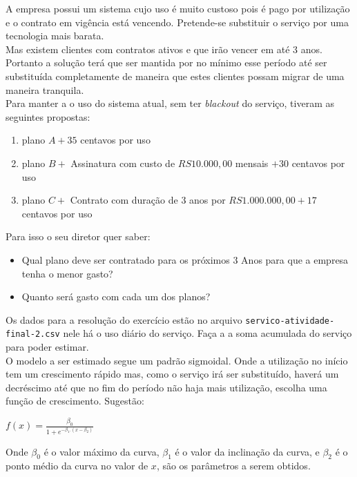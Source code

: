 \documentclass[a4paper,12pt]{article}
\begin{document}
A empresa possui um sistema cujo uso é muito custoso pois é pago por utilização e o contrato em vigência está vencendo.
Pretende-se substituir o serviço por uma tecnologia mais barata.\\

Mas existem clientes com contratos ativos e que irão vencer em até 3 anos. Portanto a solução terá que ser mantida por
no mínimo esse período até ser substituída completamente de maneira que estes clientes possam migrar de uma maneira
tranquila.\\

Para manter a o uso do sistema atual, sem ter \textit{blackout} do serviço, tiveram as seguintes propostas:

\begin{enumerate}
    \item plano $A + 35$ centavos por uso
    \item plano $B +$ Assinatura com custo de $RS 10.000,00$ mensais $+ 30$ centavos por uso
    \item plano $C +$ Contrato com duração de 3 anos por $RS 1.000.000,00 + 17$ centavos por uso\\
\end{enumerate}

Para isso o seu diretor quer saber:

\begin{itemize}
    \item Qual plano deve ser contratado para os próximos 3 Anos para que a empresa tenha o menor gasto?
    \item Quanto será gasto com cada um dos planos?
\end{itemize}
 
Os dados para a resolução do exercício estão no arquivo \texttt{servico-atividade-final-2.csv} nele há o uso diário do
serviço. Faça a a soma acumulada do serviço para poder estimar.\\
 
O modelo a ser estimado segue um padrão sigmoidal. Onde a utilização no início tem um crescimento rápido mas, como o
serviço irá ser substituído, haverá um decréscimo até que no fim do período não haja mais utilização, escolha uma
função de crescimento. Sugestão:
\begin{center}
\large $f(x) = \frac{\beta_{0}}{1 +  e^{-\beta_{1}.(x-\beta_{2})}}$\\
\end{center}
\vspace{0.1cm}
Onde $\beta_{0}$ é o valor máximo da curva, $\beta_{1}$ é o valor da inclinação da curva, e $\beta_{2}$ é o ponto médio da curva no
valor de $x$, são os parâmetros a serem obtidos.\\
\end{document}
